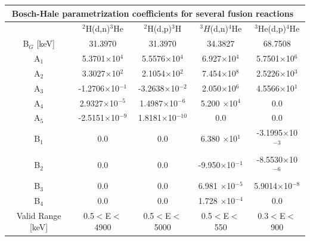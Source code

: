 {%
\noindent
\begin{table}[h!]\small
  \noindent
  \centering
  \begin{tabular}{c c c c c}
    \multicolumn{5}{c}{Bosch-Hale parametrization coefficients for several fusion reactions~\cite{bosch}}\\
    \hline
    \T\B& $^2$H(d,n)$^3$He & $^2$H(d,p)$^3$H & $^3H$(d,n)$^4$He & $^3$He(d,p)$^4$He\\
    \hline\hline
    B$_G$ [keV]\T\B& 31.3970 & 31.3970 & 34.3827 & 68.7508 \\
    \hline
    A$_1$\T& 5.3701$\times$10$^4$        & 5.5576$\times$10$^4$      & 6.927$\times$10$^4$      & 5.7501$\times$10$^6$ \\ 
    A$_2$    & 3.3027$\times$10$^2$      & 2.1054$\times$10$^2$      & 7.454$\times$10$^8$      & 2.5226$\times$10$^3$ \\
    A$_3$    & -1.2706$\times$10$^{-1}$  & -3.2638$\times$10$^{-2}$  & 2.050$\times$10$^6$      & 4.5566$\times$10$^1$ \\
    A$_4$    & 2.9327$\times$10$^{-5}$   & 1.4987$\times$10$^{-6}$   & 5.200 $\times$10$^4$     & 0.0 \\
    A$_5$  \B& -2.5151$\times$10$^{-9}$  & 1.8181$\times$10$^{-10}$  & 0.0                      & 0.0 \\
    \hline
    B$_1$\T& 0.0                         & 0.0                       & 6.380 $\times$10$^1$     & -3.1995$\times$10$^{-3}$ \\
    B$_2$    & 0.0                       & 0.0                       & -9.950$\times$10$^{-1}$  & -8.5530$\times$10$^{-6}$ \\
    B$_3$    & 0.0                       & 0.0                       & 6.981 $\times$10$^{-5}$  & 5.9014$\times$10$^{-8}$ \\
    B$_4$\B & 0.0                        & 0.0                       & 1.728 $\times$10$^{-4}$  & 0.0\\
    \hline
    Valid Range [keV] \T\B& 0.5$<$E$<$4900 & 0.5$<$E$<$5000 & 0.5$<$E$<$550 & 0.3$<$E$<$900 \\
    \hline
  \end{tabular}
  \label{table:xsParam}
\end{table}

}
